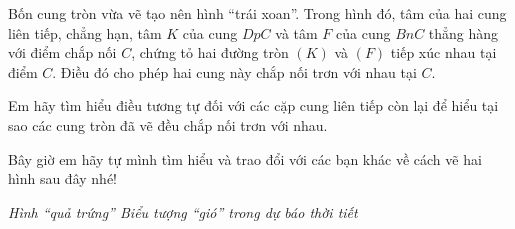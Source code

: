 \begin{exercises}
    Bốn cung tròn vừa vẽ tạo nên hình ``trái xoan''. Trong hình đó, tâm của hai cung liên tiếp, chẳng hạn, tâm $K$ của cung $DpC$ và tâm $F$ của cung $BnC$ thẳng hàng với điểm chắp nối $C$, chứng tỏ hai đường tròn $(K)$ và $(F)$ tiếp xúc nhau tại điểm $C$. Điều đó cho phép hai cung này chắp nối trơn với nhau tại $C$.

    Em hãy tìm hiểu điều tương tự đối với các cặp cung liên tiếp còn lại để hiểu tại sao các cung tròn đã vẽ đều chắp nối trơn với nhau.

    Bây giờ em hãy tự mình tìm hiểu và trao đổi với các bạn khác về cách vẽ hai hình sau đây nhé!


    \begin{center}
        \textit{Hình ``quả trứng'' \qquad Biểu tượng ``gió'' trong dự báo thời tiết}
    \end{center}
\end{exercises}
